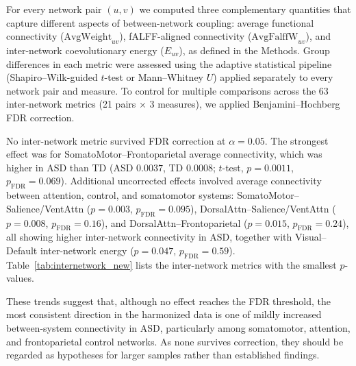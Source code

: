 \documentclass[10pt,letterpaper]{article}
\begin{document}
For every network pair $(u,v)$ we computed three complementary quantities that capture different
aspects of between-network coupling: average functional connectivity ($\mathrm{AvgWeight}_{uv}$),
fALFF-aligned connectivity ($\mathrm{AvgFalffW}_{uv}$), and inter-network coevolutionary energy
($E_{uv}$), as defined in the Methods. Group differences in each metric were assessed using the
adaptive statistical pipeline (Shapiro--Wilk-guided $t$-test or Mann--Whitney $U$) applied
separately to every network pair and measure. To control for multiple comparisons across the 63
inter-network metrics (21 pairs $\times$ 3 measures), we applied Benjamini--Hochberg FDR correction.

No inter-network metric survived FDR correction at $\alpha = 0.05$. The strongest effect was for
SomatoMotor--Frontoparietal average connectivity, which was higher in ASD than TD (ASD $0.0037$, TD
$0.0008$; $t$-test, $p = 0.0011$, $p_{\mathrm{FDR}} = 0.069$). Additional uncorrected effects
involved average connectivity between attention, control, and somatomotor systems: SomatoMotor--
Salience/VentAttn ($p = 0.003$, $p_{\mathrm{FDR}} = 0.095$), DorsalAttn--Salience/VentAttn
($p = 0.008$, $p_{\mathrm{FDR}} = 0.16$), and DorsalAttn--Frontoparietal ($p = 0.015$,
$p_{\mathrm{FDR}} = 0.24$), all showing higher inter-network connectivity in ASD, together with
Visual--Default inter-network energy ($p = 0.047$, $p_{\mathrm{FDR}} = 0.59$).
Table~\ref{tab:internetwork_new} lists the inter-network metrics with the smallest $p$-values.

These trends suggest that, although no effect reaches the FDR threshold, the most consistent
direction in the harmonized data is one of mildly increased between-system connectivity in ASD,
particularly among somatomotor, attention, and frontoparietal control networks. As none survives
correction, they should be regarded as hypotheses for larger samples rather than established
findings.
\end{document}
